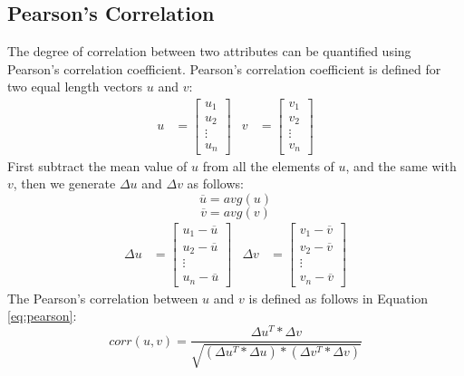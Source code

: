 \documentclass[USenglish]{uit-thesis}
\begin{document}
\subsection{Pearson's Correlation}
The degree of correlation between two attributes
can be quantified using Pearson's correlation coefficient.
Pearson's correlation coefficient is defined for two equal
length vectors $u$ and $v$:
\begin{align}
u &= \begin{bmatrix}
u_{1} \\
u_{2} \\
\vdots \\
u_{n}
\end{bmatrix} &
v &= \begin{bmatrix}
v_{1}\\
v_{2}\\
\vdots\\
v_{n}
\end{bmatrix}
\end{align}
First subtract the mean value of $u$ from all the elements of $u$, and the same with $v$, then we generate $\Delta{u}$ and $\Delta{v}$ as follows:
\[
\overline{u} = avg(u)
\]
\[
\overline{v} = avg(v)
\]
\begin{align}
\Delta{u} &=\begin{bmatrix}
u_{1} - \overline{u}\\
u_{2} - \overline{u}\\
\vdots\\
u_{n} - \overline{u}
\end{bmatrix} &
\Delta{v} &=\begin{bmatrix}
v_{1} - \overline{v}\\
v_{2} - \overline{v}\\
\vdots\\
v_{n} - \overline{v}
\end{bmatrix} 
\end{align}
The Pearson's correlation between $u$ and $v$ is defined as follows
in Equation\,\ref{eq:pearson}:
\begin{equation}
\label{eq:pearson}
corr(u,v) = \frac{\Delta{u^{T}} * \Delta{v}}{\sqrt{(\Delta{u^{T}}*\Delta{u})*(\Delta{v^{T}}*\Delta{v})}}
\end{equation}

\end{document}
